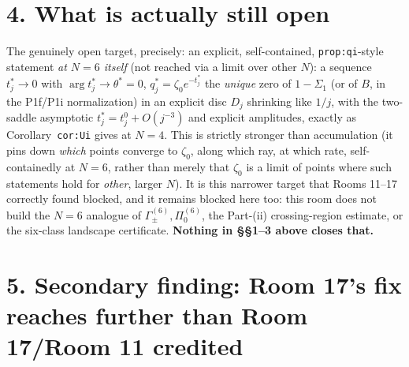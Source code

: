 \documentclass[11pt]{article}
\begin{document}
\section*{4. What is actually still open}

The genuinely open target, precisely: an explicit, self-contained, \texttt{prop:qi}-style statement
\emph{at $N=6$ itself} (not reached via a limit over other $N$): a sequence $t^\ast_j\to0$ with
$\arg t^\ast_j\to\theta^\ast=0$, $q^\ast_j=\zeta_0e^{-t^\ast_j}$ the \emph{unique} zero of
$1-\Sigma_1$ (or of $B$, in the P1f/P1i normalization) in an explicit disc $D_j$ shrinking like
$1/j$, with the two-saddle asymptotic $t^\ast_j=t^0_j+O(j^{-3})$ and explicit amplitudes, exactly as
Corollary~\texttt{cor:Ui} gives at $N=4$. This is strictly stronger than accumulation (it pins down
\emph{which} points converge to $\zeta_0$, along which ray, at which rate, self-containedly at
$N=6$, rather than merely that $\zeta_0$ is a limit of points where such statements hold for
\emph{other}, larger $N$). It is this narrower target that Rooms 11--17 correctly found blocked, and
it remains blocked here too: this room does not build the $N=6$ analogue of
$\Gamma_\pm^{(6)},\Pi_0^{(6)}$, the Part-(ii) crossing-region estimate, or the six-class landscape
certificate. \textbf{Nothing in \S\S1--3 above closes that.}

\section*{5. Secondary finding: Room 17's fix reaches further than Room 17/Room 11 credited}
\label{sec:secondary}
\end{document}
